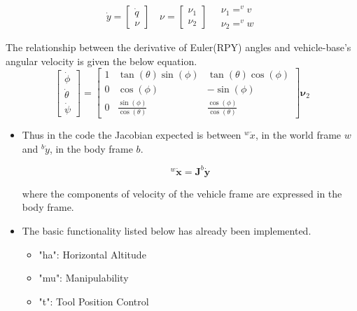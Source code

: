 \documentclass{article}
\begin{document}
\begin{equation}
\dot{y}=\left[\begin{array}{l}{\dot{q}} \\ {\nu}\end{array}\right] \quad \nu=\left[\begin{array}{l}{\nu_{1}} \\ {\nu_{2}}\end{array}\right] \quad \begin{array}{l}{\nu_{1}=^{v} v} \\ {\nu_{2}=^{v} w}\end{array}
\end{equation}

The relationship between the derivative of Euler(RPY) angles and vehicle-base's angular velocity is given the below equation.   
\begin{equation}
\left[\begin{array}{c}{\dot{\phi}} \\ {\dot{\theta}} \\ {\dot{\psi}}\end{array}\right]=\left[\begin{array}{ccc}{1} & {\tan (\theta) \sin (\phi)} & {\tan (\theta) \cos (\phi)} \\ {0} & {\cos (\phi)} & {-\sin (\phi)} \\ {0} & {\frac{\sin (\phi)}{\cos (\theta)}} & {\frac{\cos (\phi)}{\cos (\theta)}}\end{array}\right] \boldsymbol{\nu}_{2}
\end{equation}

\begin{itemize}
	\item Thus in the code the Jacobian expected is between $^{w}\dot{x}$, in the world frame ${w}$ and $^{b}\dot{y}$, in the body frame ${b}$. 
	
	\begin{equation}
	^{w} \dot{\boldsymbol{x}}=\boldsymbol{J}  ^{b}\dot{\boldsymbol{y}}
	\end{equation}
	
	where the components of velocity of the vehicle frame are expressed in the body frame. 
	
	\item The basic functionality listed below has already been implemented.
	\begin{itemize}
		\item "ha": Horizontal Altitude
		\item "mu": Manipulability
		\item "t": Tool Position Control
	\end{itemize}
\end{itemize}
\end{document}
